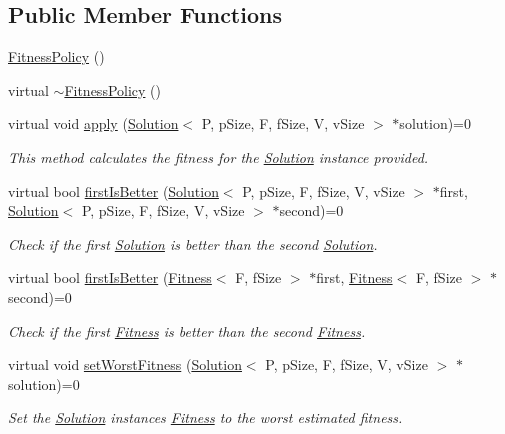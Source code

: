 \subsection*{Public Member Functions}
\begin{DoxyCompactItemize}
\item 
\hyperlink{classFitnessPolicy_adaef071884faada05a7c3e6a32627ee6}{Fitness\+Policy} ()
\item 
virtual \hyperlink{classFitnessPolicy_adfac4092c631ea82aa5cd0ea03526d1e}{$\sim$\+Fitness\+Policy} ()
\item 
virtual void \hyperlink{classFitnessPolicy_a069122b137e7a1b9d66e1d026c4e7f1b}{apply} (\hyperlink{classSolution}{Solution}$<$ P, p\+Size, F, f\+Size, V, v\+Size $>$ $\ast$solution)=0
\begin{DoxyCompactList}\small\item\em This method calculates the fitness for the \hyperlink{classSolution}{Solution} instance provided. \end{DoxyCompactList}\item 
virtual bool \hyperlink{classFitnessPolicy_acaf9a99792b12c78eaabc0acadd1de9f}{first\+Is\+Better} (\hyperlink{classSolution}{Solution}$<$ P, p\+Size, F, f\+Size, V, v\+Size $>$ $\ast$first, \hyperlink{classSolution}{Solution}$<$ P, p\+Size, F, f\+Size, V, v\+Size $>$ $\ast$second)=0
\begin{DoxyCompactList}\small\item\em Check if the first \hyperlink{classSolution}{Solution} is better than the second \hyperlink{classSolution}{Solution}. \end{DoxyCompactList}\item 
virtual bool \hyperlink{classFitnessPolicy_a48f875a28b12833e6bccbb0114e82c47}{first\+Is\+Better} (\hyperlink{structFitness}{Fitness}$<$ F, f\+Size $>$ $\ast$first, \hyperlink{structFitness}{Fitness}$<$ F, f\+Size $>$ $\ast$second)=0
\begin{DoxyCompactList}\small\item\em Check if the first \hyperlink{structFitness}{Fitness} is better than the second \hyperlink{structFitness}{Fitness}. \end{DoxyCompactList}\item 
virtual void \hyperlink{classFitnessPolicy_a62bdba18c54f1380881f9e45d8aabf0c}{set\+Worst\+Fitness} (\hyperlink{classSolution}{Solution}$<$ P, p\+Size, F, f\+Size, V, v\+Size $>$ $\ast$solution)=0
\begin{DoxyCompactList}\small\item\em Set the \hyperlink{classSolution}{Solution} instance\textquotesingle{}s \hyperlink{structFitness}{Fitness} to the worst estimated fitness. \end{DoxyCompactList}\item 

\end{DoxyCompactItemize}
